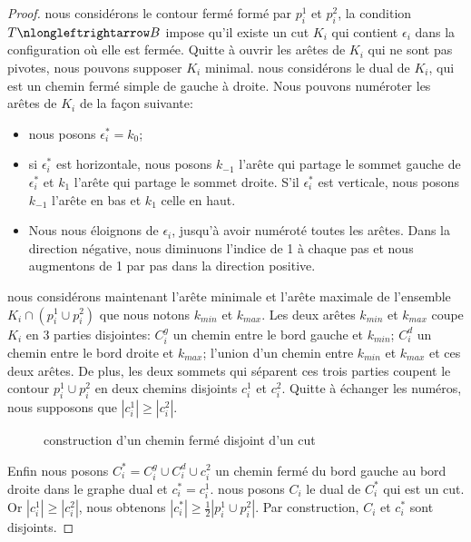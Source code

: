 \documentclass[titlepage,a4paper,12pt]{article}
\begin{document}
\begin{proof}
nous considérons le contour fermé formé par $p_i^1$ et $p_i^2$, la condition $T\nlongleftrightarrow B$ impose qu'il existe un cut $K_i$ qui contient $\epsilon_i$ dans la configuration où elle est fermée. Quitte à ouvrir les arêtes de $K_i$ qui ne sont pas pivotes, nous pouvons supposer $K_i$ minimal. nous considérons le dual de $K_i$, qui est un chemin fermé simple de gauche à droite. Nous pouvons numéroter les arêtes de $K_i$ de la façon suivante:
\begin{itemize}
\item nous posons $\epsilon^*_i = k_0$;
\item si $\epsilon^*_i$ est horizontale, nous posons $k_{-1}$ l'arête qui partage le sommet gauche de $\epsilon^*_i$ et $k_1$ l'arête qui partage le sommet droite. S'il $\epsilon_i^*$ est verticale, nous posons $k_{-1}$ l'arête en bas et $k_1$ celle en haut.
\item Nous nous éloignons de $\epsilon_i$, jusqu'à avoir numéroté toutes les arêtes. Dans la direction négative, nous diminuons l'indice de 1 à chaque pas et nous augmentons de 1 par pas dans la direction positive.
\end{itemize}

nous considérons maintenant l'arête minimale et l'arête maximale de l'ensemble $K_i\cap (p_i^1\cup p_i^2)$ que nous notons $k_{min}$ et $k_{max}$. Les deux arêtes $k_{min}$ et $k_{max}$ coupe $K_i$ en 3 parties disjointes: $C^g_i$ un chemin entre le bord gauche et $k_{min}$; $C^d_i$ un chemin entre le bord droite et $k_{max}$; l'union d'un chemin entre $k_{min}$ et $k_{max}$ et ces deux arêtes. De plus, les deux sommets qui séparent ces trois parties coupent le contour $p_i^1\cup p_i^2$ en deux chemins disjoints $c_i^1$ et $c_i^2$. Quitte à échanger les numéros, nous supposons que $|c_i^1| \geqslant |c_i^2|$.
\begin{figure}[h]
\center
{}
\caption{construction d'un chemin fermé disjoint d'un cut}
\end{figure}

Enfin nous posons $C^*_i = C^g_i \cup C^d_i \cup c_i^2$ un chemin fermé du bord gauche au bord droite dans le graphe dual et $c_i^* = c_i^1$. nous posons $C_i$ le dual de $C^*_i$ qui est un cut. Or $|c_i^1| \geqslant |c_i^2|$, nous obtenons $|c^*_i| \geqslant \frac{1}{2}|p_i^1\cup p_i^2|$. Par construction, $C_i$ et $c_i^*$ sont disjoints.
\end{proof}
\end{document}
